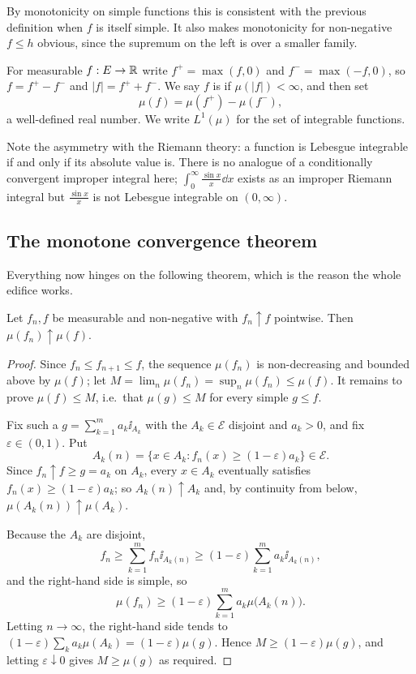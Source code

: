 \documentclass[a4paper]{scrartcl}
\newcommand{\cE}{\mathcal{E}}
\newcommand{\ind}{\ii}
\begin{document}
By monotonicity on simple functions this is consistent with the previous definition when $f$ is itself simple. It also makes monotonicity for non-negative $f \leq h$ obvious, since the supremum on the left is over a smaller family.

\begin{definition}
	For measurable $f : E \to \mathbb{R}$ write $f^+ = \max(f, 0)$ and $f^- = \max(-f, 0)$, so $f = f^+ - f^-$ and $|f| = f^+ + f^-$. We say $f$ is  if $\mu(|f|) < \infty$, and then set
	$$
	\mu(f) = \mu(f^+) - \mu(f^-),
	$$
	a well-defined real number. We write $L^1(\mu)$ for the set of integrable functions.
\end{definition}

Note the asymmetry with the Riemann theory: a function is Lebesgue integrable if and only if its absolute value is. There is no analogue of a conditionally convergent improper integral here; $\int_0^\infty \frac{\sin x}{x}\dd x$ exists as an improper Riemann integral but $\frac{\sin x}{x}$ is not Lebesgue integrable on $(0,\infty)$.

\subsection{The monotone convergence theorem}

Everything now hinges on the following theorem, which is the reason the whole edifice works.

\begin{theorem}\label{pm-thm:mct}
	Let $f_n, f$ be measurable and non-negative with $f_n \uparrow f$ pointwise. Then $\mu(f_n) \uparrow \mu(f)$.
\end{theorem}
\begin{proof}
	Since $f_n \leq f_{n+1} \leq f$, the sequence $\mu(f_n)$ is non-decreasing and bounded above by $\mu(f)$; let $M = \lim_n \mu(f_n) = \sup_n \mu(f_n) \leq \mu(f)$. It remains to prove $\mu(f) \leq M$, i.e.\ that $\mu(g) \leq M$ for every simple $g \leq f$.

	Fix such a $g = \sum_{k=1}^m a_k \ind_{A_k}$ with the $A_k \in \cE$ disjoint and $a_k > 0$, and fix $\varepsilon \in (0,1)$. Put
	$$
	A_k(n) = \{ x \in A_k : f_n(x) \geq (1-\varepsilon)a_k \} \in \cE.
	$$
	Since $f_n \uparrow f \geq g = a_k$ on $A_k$, every $x \in A_k$ eventually satisfies $f_n(x) \geq (1-\varepsilon)a_k$; so $A_k(n) \uparrow A_k$ and, by continuity from below, $\mu(A_k(n)) \uparrow \mu(A_k)$.

	Because the $A_k$ are disjoint,
	$$
	f_n \geq \sum_{k=1}^m f_n \ind_{A_k(n)} \geq (1-\varepsilon)\sum_{k=1}^m a_k \ind_{A_k(n)},
	$$
	and the right-hand side is simple, so
	$$
	\mu(f_n) \geq (1-\varepsilon)\sum_{k=1}^m a_k \mu\big(A_k(n)\big).
	$$
	Letting $n \to \infty$, the right-hand side tends to $(1-\varepsilon)\sum_k a_k \mu(A_k) = (1-\varepsilon)\mu(g)$. Hence $M \geq (1-\varepsilon)\mu(g)$, and letting $\varepsilon \downarrow 0$ gives $M \geq \mu(g)$ as required.
\end{proof}
\end{document}
